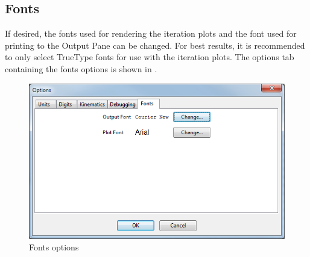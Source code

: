 \subsection{Fonts} \label{ssec:optionsFonts}

If desired, the fonts used for rendering the iteration plots and the font used for printing to the Output Pane can be changed.  For best results, it is recommended to only select TrueType fonts for use with the iteration plots.  The options tab containing the fonts options is shown in .

\begin{figure}
\includegraphics[width=\textwidth]{images/optionsFonts}
\caption{Fonts options} \label{fig:optionsFonts}
\centering
\end{figure}
